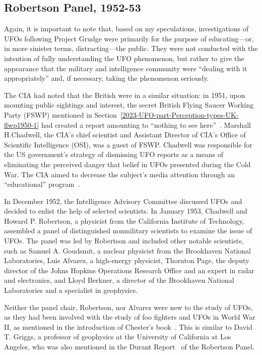 \subsection{Robertson Panel, 1952-53}
\label{2023-UFO-part-Perception-types-USA-RP}

Again, it is important to note that, based on my speculations, investigations of UFOs following Project Grudge were primarily
for the purpose of educating---or, in more sinister terms, distracting---the public. They were not conducted with
the intention of fully understanding the UFO phenomenon,
but rather to give the appearance that the military and intelligence community were ``dealing with it appropriately''
and, if necessary, taking the phenomenon seriously.

The CIA had noted that the British were in a similar situation: in 1951, upon mounting public sightings and interest,
the secret British Flying Saucer Working Party (FSWP) mentioned in Section~\ref{2023-UFO-part-Perception-types-UK-flwp1950-1}
had created a report amounting to ``nothing to see here''~\cite{FSWP1951}.
Marshall H.Chadwell, the CIA's chief scientist and Assistant Director of CIA's Office of Scientific Intelligence (OSI), was a guest of FSWP. Chadwell was responsible for the US government's strategy of dismissing UFO reports as a means of eliminating the perceived danger that belief in UFOs presented during the Cold War. The CIA aimed to decrease the subject's media attention through an ``educational'' program~\cite{ClarkeFSWP}.

In December 1952, the Intelligence Advisory Committee discussed UFOs and decided to enlist the help of selected scientists.
In January 1953, Chadwell
and Howard P. Robertson, a physicist from the California Institute of Technology,
assembled a panel of distinguished nonmilitary scientists to examine the issue of UFOs.
The panel was led by Robertson and included other notable scientists, such as Samuel A. Goudsmit,
a nuclear physicist from the Brookhaven National Laboratories, Luis Alvarez,
a high-energy physicist, Thornton Page, the deputy director of the Johns Hopkins Operations Research Office and an expert in radar and electronics,
and Lloyd Berkner, a director of the Brookhaven National Laboratories and a specialist in geophysics.



Neither the panel chair, Robertson, nor Alvarez were new to the study of UFOs,
as they had been involved with the study of foo fighters and UFOs in World War II,
 as mentioned in the introduction of Chester's book~\cite{Chester2007May}.
This is similar to David T. Griggs, a professor of geophysics at the University of California at Los Angeles, who was also mentioned in the
Durant Report~\cite{RobertsonPanelDurantReport} of the Robertson Panel.

